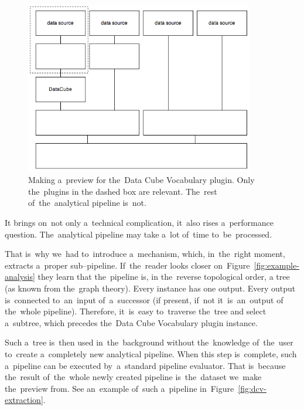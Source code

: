\begin{figure}
	\centering
	\includegraphics[width=100mm]{img/dcv-preview-useful.png}
	\caption{Making a~preview for the~Data Cube Vocabulary plugin. Only the~plugins in
	the dashed box are relevant. The~rest of~the~analytical pipeline is~not.}
	\label{fig:dcv-preview-useful}
\end{figure}

It brings on~not only a~technical complication, it~also rises a~performance 
question. The~analytical pipeline may take a~lot of~time to~be~processed.

That is~why we~had to~introduce a~mechanism, which, in~the~right moment, 
extracts a~proper sub--pipeline. If~the~reader looks closer on~Figure~\ref{fig:example-analysis} they learn that the~pipeline is,
in the~reverse topological order, 
a tree (as known from the~graph theory). Every instance has 
one output. Every output is~connected to~an~input of~a~successor (if present, if~not it~is~an~output
of the~whole pipeline). Therefore, it~is~easy to~traverse the~tree and select a~subtree, which precedes the~Data Cube Vocabulary plugin instance.

Such a~tree is~then used in~the~background without the~knowledge of~the~user to~create a~completely new analytical pipeline. When this step is~complete, such a~pipeline can 
be executed by~a~standard pipeline evaluator. That is~because the~result of~the~whole 
newly created pipeline is~the~dataset we~make the~preview from.
See an~example of~such a~pipeline in~Figure~\ref{fig:dcv-extraction}.

